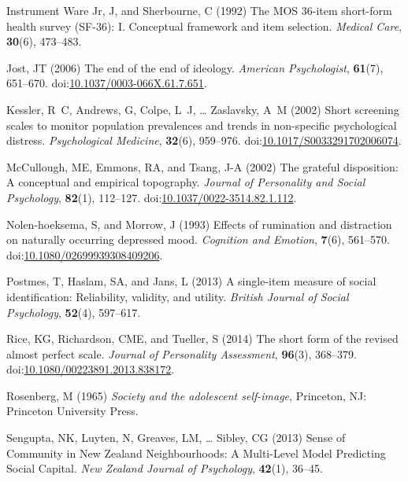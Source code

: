 \documentclass[
  single column]{article}
\newlength{\cslhangindent}
\newenvironment{CSLReferences}[2] %
 {\begin{list}{}{%
  \setlength{\itemindent}{0pt}
  \setlength{\leftmargin}{0pt}
  \setlength{\parsep}{0pt}
  \ifodd #1
   \setlength{\leftmargin}{\cslhangindent}
   \setlength{\itemindent}{-1\cslhangindent}
  \fi
  \setlength{\itemsep}{#2\baselineskip}}}
 {\end{list}}
\begin{document}
\begin{CSLReferences}{1}{0}
Instrument Ware Jr, J, and Sherbourne, C (1992) The MOS 36-item
short-form health survey (SF-36): I. Conceptual framework and item
selection. \emph{Medical Care}, \textbf{30}(6), 473--483.

Jost, JT (2006) The end of the end of ideology. \emph{American
Psychologist}, \textbf{61}(7), 651--670.
doi:\href{https://doi.org/10.1037/0003-066X.61.7.651}{10.1037/0003-066X.61.7.651}.

Kessler, R~C, Andrews, G, Colpe, L~J, \ldots{} Zaslavsky, A~M (2002)
Short screening scales to monitor population prevalences and trends in
non-specific psychological distress. \emph{Psychological Medicine},
\textbf{32}(6), 959--976.
doi:\href{https://doi.org/10.1017/S0033291702006074}{10.1017/S0033291702006074}.

McCullough, ME, Emmons, RA, and Tsang, J-A (2002) The grateful
disposition: A conceptual and empirical topography. \emph{Journal of
Personality and Social Psychology}, \textbf{82}(1), 112--127.
doi:\href{https://doi.org/10.1037/0022-3514.82.1.112}{10.1037/0022-3514.82.1.112}.

Nolen-hoeksema, S, and Morrow, J (1993) Effects of rumination and
distraction on naturally occurring depressed mood. \emph{Cognition and
Emotion}, \textbf{7}(6), 561--570.
doi:\href{https://doi.org/10.1080/02699939308409206}{10.1080/02699939308409206}.

Postmes, T, Haslam, SA, and Jans, L (2013) A single-item measure of
social identification: Reliability, validity, and utility. \emph{British
Journal of Social Psychology}, \textbf{52}(4), 597--617.

Rice, KG, Richardson, CME, and Tueller, S (2014) The short form of the
revised almost perfect scale. \emph{Journal of Personality Assessment},
\textbf{96}(3), 368--379.
doi:\href{https://doi.org/10.1080/00223891.2013.838172}{10.1080/00223891.2013.838172}.

Rosenberg, M (1965) \emph{Society and the adolescent self-image},
Princeton, NJ: Princeton University Press.

Sengupta, NK, Luyten, N, Greaves, LM, \ldots{} Sibley, CG (2013) Sense
of Community in {N}ew {Z}ealand Neighbourhoods: A Multi-Level Model
Predicting Social Capital. \emph{New Zealand Journal of Psychology},
\textbf{42}(1), 36--45.


\end{CSLReferences}
\end{document}
